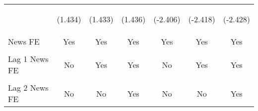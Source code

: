 \documentclass[border=0.2cm]{standalone}
\begin{document}
\begin{tabular}{lcccccc}
    \vspace{12pt}          & \begin{footnotesize}(1.434)\end{footnotesize}  & \begin{footnotesize}(1.433)\end{footnotesize}  & \begin{footnotesize}(1.436)\end{footnotesize}  & \begin{footnotesize}(-2.406)\end{footnotesize}  & \begin{footnotesize}(-2.418)\end{footnotesize} & \begin{footnotesize}(-2.428)\end{footnotesize} \\
    News FE                & Yes                                            & Yes                                            & Yes                                            & Yes                                             & Yes                                            & Yes                                            \\
    \vspace{4pt}           &                                                &                                                &                                                &                                                 &                                                &                                                \\
    Lag 1 News FE          & No                                             & Yes                                            & Yes                                            & No                                              & Yes                                            & Yes                                            \\
    \vspace{4pt}           &                                                &                                                &                                                &                                                 &                                                &                                                \\
    Lag 2 News FE          & No                                             & No                                             & Yes                                            & No                                              & No                                             & Yes                                            \\

\end{tabular}
\end{document}
